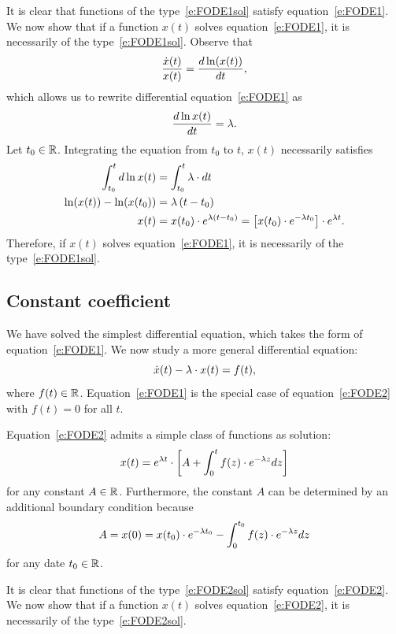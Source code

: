 \documentclass[letterpaper, 11pt, leqno]{article}
\begin{document}
It is clear that functions of the type~\eqref{e:FODE1sol} satisfy equation~\eqref{e:FODE1}. We now show that if a function $x(t)$ solves equation~\eqref{e:FODE1}, it is necessarily of the type~\eqref{e:FODE1sol}.
Observe that
\begin{equation*}
\frac{\dot{x}(t)}{x(t)}=\od{\ln{x(t)}}{t},
\end{equation*}
which allows us to rewrite differential equation~\eqref{e:FODE1} as 
\begin{equation*}
\frac{d\ln x(t)}{dt}=\l.
\end{equation*}
Let $t_{0}\in\mathbb{R}$. Integrating the equation from $t_{0}$ to $t$, $x(t)$ necessarily satisfies
\begin{align*}
\int_{t_{0}}^{t} d\ln x(t)&=\int_{t_{0}}^{t} \l\cdot dt\\
\ln{x(t)} -\ln{x(t_{0})}& =\l \bp{t-t_{0}}\\
x(t)&=x(t_{0})\cdot e^{\l (t-t_{0})}=\bs{x(t_{0})\cdot e^{-\l t_{0}}}\cdot e^{\l t}.
\end{align*}
Therefore, if $x(t)$ solves equation~\eqref{e:FODE1}, it is necessarily of the type~\eqref{e:FODE1sol}.

\subsection{Constant coefficient}

We have solved the simplest differential equation, which takes the form of equation~\eqref{e:FODE1}. We now study a more general differential equation: 
\begin{equation}
\dot{x}(t)-\lambda \cdot x(t) =f(t),\label{e:FODE2}
\end{equation}
where $f(t)\in \mathbb{R}$. Equation~\eqref{e:FODE1} is the special case of equation~\eqref{e:FODE2} with $f(t)=0$ for all $t$.

Equation~\eqref{e:FODE2} admits a simple class of functions as solution:
\begin{equation}
x(t)=e^{\lambda t} \cdot \left[ A+\int_{0}^{t}f(z) \cdot e^{-\lambda z} dz \right] \label{e:FODE2sol}
\end{equation}
for any constant $A\in \mathbb{R}$. Furthermore, the constant $A$ can be determined by an additional boundary condition because
\begin{equation*}
A=x(0)=x(t_{0})\cdot e^{-\lambda t_{0}}-\int_{0}^{t_{0}}f(z) \cdot e^{-\lambda z} dz
\end{equation*}
for any date $t_{0}\in \mathbb{R}$.

It is clear that functions of the type~\eqref{e:FODE2sol} satisfy equation~\eqref{e:FODE2}. We now show that if a function $x(t)$ solves equation~\eqref{e:FODE2}, it is necessarily of the type~\eqref{e:FODE2sol}.
\end{document}
